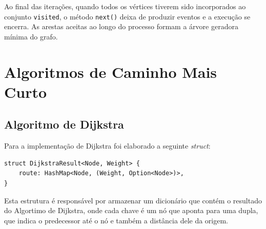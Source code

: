 Ao final das iterações, quando todos os vértices tiverem sido
incorporados ao conjunto \texttt{visited}, o método \texttt{next()}
deixa de produzir eventos e a execução se encerra. As arestas aceitas
ao longo do processo formam a árvore geradora mínima do grafo.

\section{Algoritmos de Caminho Mais Curto}

\subsection{Algoritmo de Dijkstra}
Para a implementação de Dijkstra foi elaborado a seguinte \textit{struct}:
\begin{listing}[H]
  \caption{Estrutura do iterador de Dijkstra}
\begin{verbatim}
struct DijkstraResult<Node, Weight> {
    route: HashMap<Node, (Weight, Option<Node>)>,
}
\end{verbatim}
\end{listing}

Esta estrutura é responsável por armazenar um dicionário que contém o
resultado do Algortimo de Dijkstra, onde cada chave é um nó que
aponta para uma dupla, que indica o predecessor até o nó e também a
distância dele da origem.

